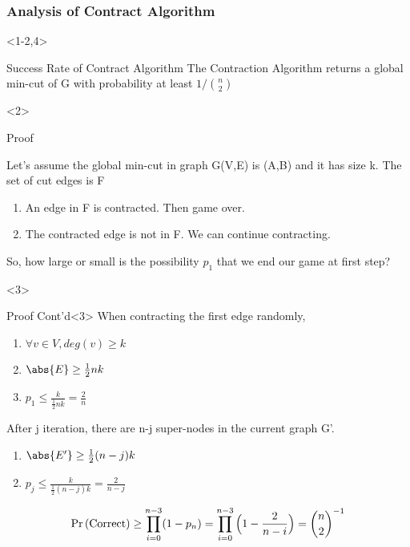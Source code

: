 \documentclass{beamer}
\begin{document}
\frametitle{Analysis of Contract Algorithm}
\begin{overlayarea}{\linewidth}{\textheight}
\begin{onlyenv}<1-2,4>
\begin{block}{Success Rate of Contract Algorithm}
The Contraction Algorithm returns a global min-cut of G with probability at least $1/\binom n2$	
\end{block}
\end{onlyenv}

\begin{onlyenv}<2>

\begin{block}{Proof}

Let's assume the global min-cut in graph G(V,E) is (A,B) and it has size k. The set of cut edges is F
\begin{enumerate}[{Case}.1]
\item An edge in F is contracted. Then game over.
\item The contracted edge is not in F. We can continue contracting.
\end{enumerate}
So, how large or small is the possibility $p_1$ that we end our game at first step? \\
\end{block}
\end{onlyenv}

\begin{onlyenv}<3>
\begin{block}{Proof Cont'd}<3>
When contracting the first edge randomly,
\begin{enumerate}
	\item $\forall v \in V, deg(v)\geq k$
	\item $\abs{E}\geq \frac{1}{2}nk$
	\item $p_1\leq \frac{k}{\frac{1}{2}nk}=\frac{2}{n}$
\end{enumerate}
After j iteration, there are n-j super-nodes in the current graph G'.
\begin{enumerate}			
	\item $\abs{E'}\geq \frac{1}{2}(n-j)k$
	\item $p_j\leq \frac{k}{\frac{1}{2}(n-j)k}=\frac{2}{n-j}$
\end{enumerate}
\begin{equation*}
\Pr\left(\text{Correct}\right)\geq \prod _{i=0}^{n-3}(1-p_n) = \prod _{i=0}^{n-3}{\Bigl (}1-{\frac {2}{n-i}}{\Bigr )}={\binom n2}^{-1}
\end{equation*}
\end{block}
\end{onlyenv}

\end{overlayarea}
\end{document}
